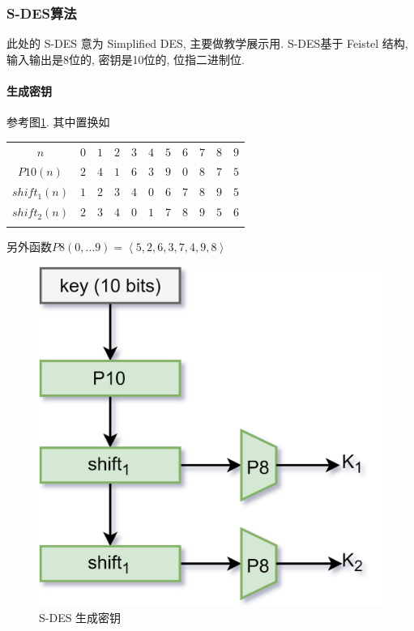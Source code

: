 \documentclass{ctexart}
\newlength{\Oldarrayrulewidth}
\newcommand{\Hline}[1]{
  \noalign{\global\setlength{\Oldarrayrulewidth}{\arrayrulewidth}}
  \noalign{\global\setlength{\arrayrulewidth}{#1}}\hline
  \noalign{\global\setlength{\arrayrulewidth}{\Oldarrayrulewidth}}}
\newcommand{\Topline}{\Hline{0.08em}}
\newcommand{\Bottomline}{\Hline{0.08em}}
\newcommand{\Midline}{\Hline{0.05em}}
\begin{document}
\subsubsection{S-DES算法}
    此处的 S-DES 意为 Simplified DES, 主要做教学展示用.
    S-DES基于 Feistel 结构, 输入输出是8位的, 密钥是10位的, 位指二进制位.\par
\paragraph{生成密钥}
    参考图\ref{s-des-keygen}. 其中置换如
    \begin{center}
    \begin{tabularx}{0.8\textwidth}{cCCCCCCCCCC}
    \Topline
    $n$ & $0$  & $1$  & $2$  & $3$  & $4$  & $5$  & $6$  & $7$  & $8$  & $9$ \\
        \Midline
        $P10(n)$ & $2$&   $4$&    $1$&  $6$&   $3$&   $9$&    $0$&   $8$&   $7$&   $5$\\
        $shift_1(n)$ & $1$  & $2$  & $3$  & $4$ & $0$ & $6$  & $7$  & $8$  & $9$ & $5$\\
        $shift_2(n)$ & $2$  & $3$  & $4$ & $0$ & $1$ & $7$  & $8$  & $9$ & $5$ & $6$\\
    \Bottomline
    \end{tabularx}
    \end{center}
    另外函数$P8(0,\ldots 9) = \left\langle 5, 2, 6, 3, 7, 4, 9, 8 \right\rangle$

    \begin{figure}[ht!]
        \centering
        \includegraphics[keepaspectratio,height=0.25\textheight,width=1.0\textwidth]{s-des-keygen.jpg}
        \caption{S-DES 生成密钥}
        \label{s-des-keygen}
    \end{figure}
\end{document}
